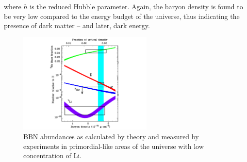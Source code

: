 where $h$ is the reduced Hubble parameter. Again, the baryon density
is found to be very low compared to the energy budget of the universe,
thus indicating the presence of dark matter -- and later, dark energy.
\begin{figure}
 \centering
\includegraphics[width=0.6\textwidth]{IntroFigures/BBN.pdf}
\caption{BBN abundances as calculated by theory and measured by
  experiments in primordial-like areas of the universe with low
  concentration of Li.\label{fig:BBN}}
\end{figure}

